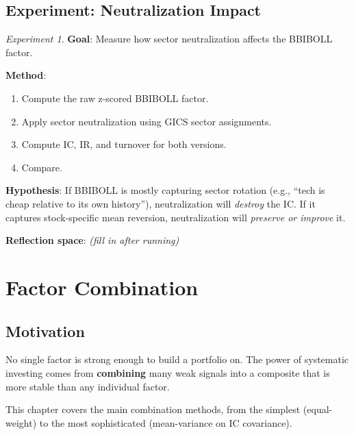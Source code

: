 \documentclass[a4paper, 11pt]{report}
\theoremstyle{definition}
\theoremstyle{remark}
\newtheorem{experiment}{Experiment}[chapter]
\begin{document}
\section{Experiment: Neutralization Impact}

\begin{experiment}
    \textbf{Goal}: Measure how sector neutralization affects the BBIBOLL
    factor.

    \textbf{Method}:
    \begin{enumerate}
        \item Compute the raw z-scored BBIBOLL factor.
        \item Apply sector neutralization using GICS sector assignments.
        \item Compute IC, IR, and turnover for both versions.
        \item Compare.
    \end{enumerate}

    \textbf{Hypothesis}: If BBIBOLL is mostly capturing sector rotation
    (e.g., ``tech is cheap relative to its own history''), neutralization will
    \emph{destroy} the IC\@.  If it captures stock-specific mean reversion,
    neutralization will \emph{preserve or improve} it.

    \textbf{Reflection space}: \emph{(fill in after running)}
\end{experiment}


\chapter{Factor Combination}
\label{ch:factor-combo}

\section{Motivation}

No single factor is strong enough to build a portfolio on.  The power of
systematic investing comes from \textbf{combining} many weak signals into a
composite that is more stable than any individual factor.

This chapter covers the main combination methods, from the simplest
(equal-weight) to the most sophisticated (mean-variance on IC covariance).
\end{document}
